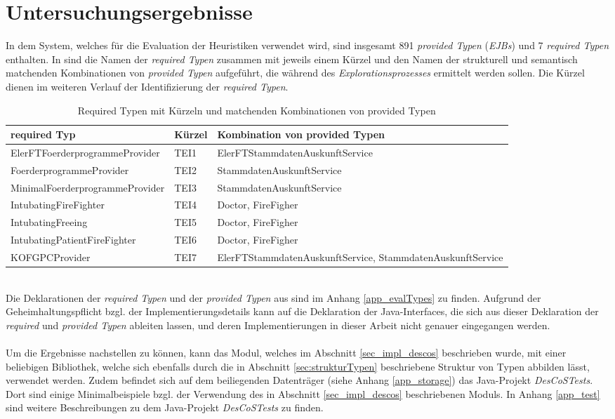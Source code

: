 \chapter{Untersuchungsergebnisse}\label{chap_evaluation}
In dem System, welches für die Evaluation der \Gls{Heuristik}en verwendet wird, sind insgesamt 891 \emph{provided Typen} (\emph{EJBs}) und 7 \emph{required Typen} enthalten. In  sind die Namen der \emph{required Typen} zusammen mit jeweils einem Kürzel und den Namen der strukturell und semantisch matchenden Kombinationen von \emph{provided Typen} aufgeführt, die während des \emph{Explorationsprozesses} ermittelt werden sollen. Die Kürzel dienen im weiteren Verlauf der Identifizierung der \emph{required Typen}.
\begin{table}[h!]
\centering
\small
\begin{tabular}{|p{6cm}|p{1.5cm}|p{6.5cm}|}
\hline
\hline
\centering\textbf{required Typ} & \textbf{Kürzel} & \textbf{Kombination von provided Typen}\\
\hline
\hline
ElerFTFoerderprogrammeProvider & TEI1 & ElerFTStammdatenAuskunftService\\
\hline
FoerderprogrammeProvider & TEI2 & StammdatenAuskunftService\\
\hline
MinimalFoerderprogrammeProvider & TEI3 & StammdatenAuskunftService\\
\hline
IntubatingFireFighter & TEI4 & Doctor, FireFigher\\
\hline
IntubatingFreeing & TEI5 & Doctor, FireFigher\\
\hline
IntubatingPatientFireFighter & TEI6 & Doctor, FireFigher\\
\hline
KOFGPCProvider & TEI7 & ElerFTStammdatenAuskunftService, StammdatenAuskunftService\\
\hline
\hline
\end{tabular}
\caption{Required Typen mit Kürzeln und matchenden Kombinationen von provided Typen}
 \label{tab:eIShort}
\end{table}
\noindent
\\
Die Deklarationen der \emph{required Typen} und der \emph{provided Typen} aus  sind im Anhang \ref{app_evalTypes} zu finden. Aufgrund der Geheimhaltungspflicht bzgl. der Implementierungsdetails kann auf die Deklaration der Java-Interfaces, die sich aus dieser Deklaration der \emph{required} und \emph{provided Typen} ableiten lassen, und deren Implementierungen in dieser Arbeit nicht genauer eingegangen werden.
\\\\
Um die Ergebnisse nachstellen zu können, kann das Modul, welches im Abschnitt \ref{sec_impl_descos} beschrieben wurde, mit einer beliebigen Bibliothek, welche sich ebenfalls durch die in Abschnitt \ref{sec:strukturTypen} beschriebene Struktur von Typen abbilden lässt, verwendet werden. Zudem befindet sich auf dem beiliegenden Datenträger (siehe Anhang \ref{app_storage}) das Java-Projekt \emph{DesCoSTests}. Dort sind einige Minimalbeispiele bzgl. der Verwendung des in Abschnitt \ref{sec_impl_descos} beschriebenen Moduls. In Anhang \ref{app_test} sind weitere Beschreibungen zu dem Java-Projekt \emph{DesCoSTests} zu finden.

